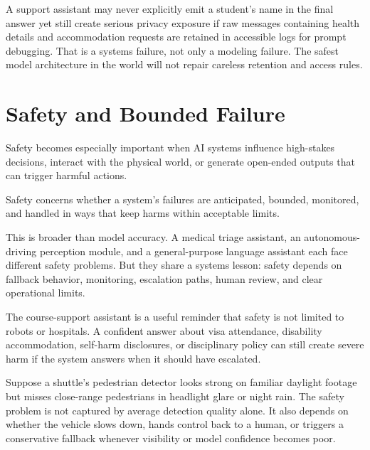 \begin{example}
A support assistant may never explicitly emit a student's name in the final answer yet still create serious privacy exposure if raw messages containing health details and accommodation requests are retained in accessible logs for prompt debugging. That is a systems failure, not only a modeling failure. The safest model architecture in the world will not repair careless retention and access rules.
\end{example}

\section{Safety and Bounded Failure}

Safety becomes especially important when AI systems influence high-stakes decisions, interact with the physical world, or generate open-ended outputs that can trigger harmful actions.

\begin{definition}[Safety]
Safety concerns whether a system's failures are anticipated, bounded, monitored, and handled in ways that keep harms within acceptable limits.
\end{definition}

This is broader than model accuracy. A medical triage assistant, an autonomous-driving perception module, and a general-purpose language assistant each face different safety problems. But they share a systems lesson: safety depends on fallback behavior, monitoring, escalation paths, human review, and clear operational limits.

The course-support assistant is a useful reminder that safety is not limited to robots or hospitals. A confident answer about visa attendance, disability accommodation, self-harm disclosures, or disciplinary policy can still create severe harm if the system answers when it should have escalated.

\begin{example}
Suppose a shuttle's pedestrian detector looks strong on familiar daylight footage but misses close-range pedestrians in headlight glare or night rain. The safety problem is not captured by average detection quality alone. It also depends on whether the vehicle slows down, hands control back to a human, or triggers a conservative fallback whenever visibility or model confidence becomes poor.
\end{example}

